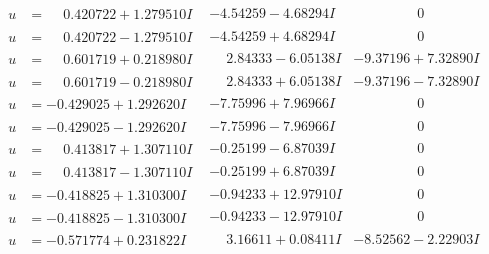 \documentclass[1p]{elsarticle_modified}
\theoremstyle{definition}
\begin{document}
$$\begin{array}{c|c|c}
\begin{aligned}
u &= \phantom{-}0.420722 + 1.279510 I\end{aligned}
 & -4.54259 - 4.68294 I & \phantom{-0.000000 } 0 \\ \hline\begin{aligned}
u &= \phantom{-}0.420722 - 1.279510 I\end{aligned}
 & -4.54259 + 4.68294 I & \phantom{-0.000000 } 0 \\ \hline\begin{aligned}
u &= \phantom{-}0.601719 + 0.218980 I\end{aligned}
 & \phantom{-}2.84333 - 6.05138 I & -9.37196 + 7.32890 I \\ \hline\begin{aligned}
u &= \phantom{-}0.601719 - 0.218980 I\end{aligned}
 & \phantom{-}2.84333 + 6.05138 I & -9.37196 - 7.32890 I \\ \hline\begin{aligned}
u &= -0.429025 + 1.292620 I\end{aligned}
 & -7.75996 + 7.96966 I & \phantom{-0.000000 } 0 \\ \hline\begin{aligned}
u &= -0.429025 - 1.292620 I\end{aligned}
 & -7.75996 - 7.96966 I & \phantom{-0.000000 } 0 \\ \hline\begin{aligned}
u &= \phantom{-}0.413817 + 1.307110 I\end{aligned}
 & -0.25199 - 6.87039 I & \phantom{-0.000000 } 0 \\ \hline\begin{aligned}
u &= \phantom{-}0.413817 - 1.307110 I\end{aligned}
 & -0.25199 + 6.87039 I & \phantom{-0.000000 } 0 \\ \hline\begin{aligned}
u &= -0.418825 + 1.310300 I\end{aligned}
 & -0.94233 + 12.97910 I & \phantom{-0.000000 } 0 \\ \hline\begin{aligned}
u &= -0.418825 - 1.310300 I\end{aligned}
 & -0.94233 - 12.97910 I & \phantom{-0.000000 } 0 \\ \hline\begin{aligned}
u &= -0.571774 + 0.231822 I\end{aligned}
 & \phantom{-}3.16611 + 0.08411 I & -8.52562 - 2.22903 I \\ \hline\begin{aligned}

\end{aligned}
\end{array}$$
\end{document}
